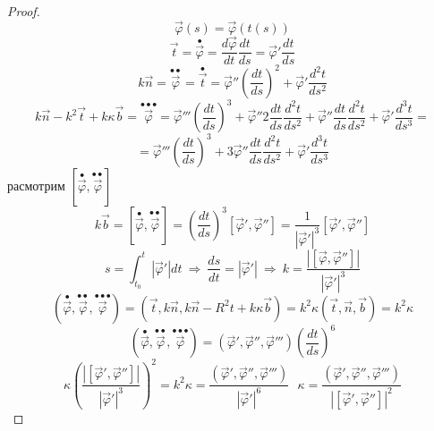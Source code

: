 \begin{proof}
  $$
  \vec \varphi(s) = \vec \varphi(t(s))
  $$
  $$
  \vec t = \stackrel{\bullet}{\vec \varphi} = \frac{d \vec \varphi}{dt}
  \frac{dt}{ds} = \vec \varphi' \frac{dt}{ds}
  $$
  $$
  k \vec n = \stackrel{\bullet \bullet}{\vec \varphi} =
  \stackrel{\bullet}{\vec t} = \vec \varphi'' \left(\frac{dt}{ds}\right)^2 +
  \vec \varphi' \frac{d^2t}{ds^2}
  $$
  $$
  k \vec n - k^2 \vec t + k \kappa \vec b =
  \stackrel{\bullet \bullet \bullet}{\vec \varphi} = \vec \varphi'''
  \left(\frac{dt}{ds}\right)^3 + \vec \varphi'' 2 \frac{dt}{ds}
  \frac{d^2 t}{ds^2} +
  \vec \varphi'' \frac{dt}{ds} \frac{d^2 t}{ds^2} + \vec \varphi'
  \frac{d^3 t}{ds^3} =
  $$
  $$
  = \vec \varphi''' \left(\frac{dt}{ds}\right)^3 + 3 \vec \varphi''
  \frac{dt}{ds}\frac{d^2t}{ds^2} + \vec \varphi' \frac{d^3t}{ds^3}
  $$
  расмотрим $[\stackrel{\bullet}{\vec \varphi},
  \stackrel{\bullet \bullet}{\vec \varphi}]$
  $$
  k \vec b = [\stackrel{\bullet}{\vec \varphi},
  \stackrel{\bullet \bullet}{\vec \varphi}] = \left(\frac{dt}{ds}\right)^3
  [\vec \varphi', \vec \varphi''] = \frac{1}{|\vec \varphi'|^3}
  [\vec \varphi', \vec \varphi'']
  $$
  $$
  s = \int_{t_0}^t |\vec \varphi'|dt ~ \Rightarrow ~ \frac{ds}{dt} =
  |\vec \varphi'| ~ \Rightarrow ~
  k = \frac{|[\vec \varphi, \vec \varphi'']|}{|\vec \varphi'|^3}
  $$
  $$
  (\stackrel{\bullet}{\vec \varphi},
  \stackrel{\bullet \bullet}{\vec \varphi},
  \stackrel{\bullet \bullet \bullet}{\vec \varphi}) = (\vec t, k \vec n,
  k \vec n - R^2t + k \kappa \vec b) = k^2 \kappa(\vec t, \vec n, \vec b) =
  k^2 \kappa
  $$
  $$
  (\stackrel{\bullet}{\vec \varphi},
  \stackrel{\bullet \bullet}{\vec \varphi},
  \stackrel{\bullet \bullet \bullet}{\vec \varphi}) =
  (\vec \varphi', \vec \varphi'', \vec \varphi''') \left(\frac{dt}{ds}\right)^6
  $$
  $$
  \kappa \left(\frac{|[\vec \varphi', \vec \varphi'']|}{|\vec \varphi'|^3}
  \right)^2 = k^2 \kappa =
  \frac{(\vec \varphi', \vec \varphi'', \vec \varphi''')}{|\vec \varphi'|^6}
  ~~~ \kappa =
  \frac{(\vec \varphi', \vec \varphi'', \vec \varphi''')}{|[\vec \varphi',
  \vec \varphi'']|^2}
  $$
\end{proof}


